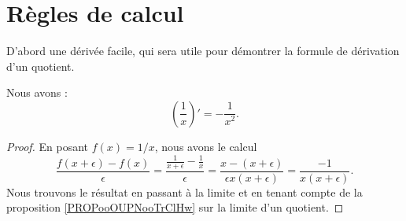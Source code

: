 \section{Règles de calcul}

D'abord une dérivée facile, qui sera utile pour démontrer la formule de dérivation d'un quotient.
\begin{lemma}
    Nous avons :
    \begin{equation}
        \left( \frac{1}{ x } \right)'=-\frac{1}{ x^2 }.
    \end{equation}
\end{lemma}

\begin{proof}
    En posant \( f(x)=1/x\), nous avons le calcul
    \begin{equation}
        \frac{ f(x+\epsilon)-f(x) }{ \epsilon }=\frac{ \frac{1}{ x+\epsilon }-\frac{1}{ x } }{ \epsilon }=\frac{ x-(x+\epsilon) }{ \epsilon x(x+\epsilon) }=\frac{ -1 }{ x(x+\epsilon) }.
    \end{equation}
    Nous trouvons le résultat en passant à la limite et en tenant compte de la proposition \ref{PROPooOUPNooTrClHw} sur la limite d'un quotient.
\end{proof}


